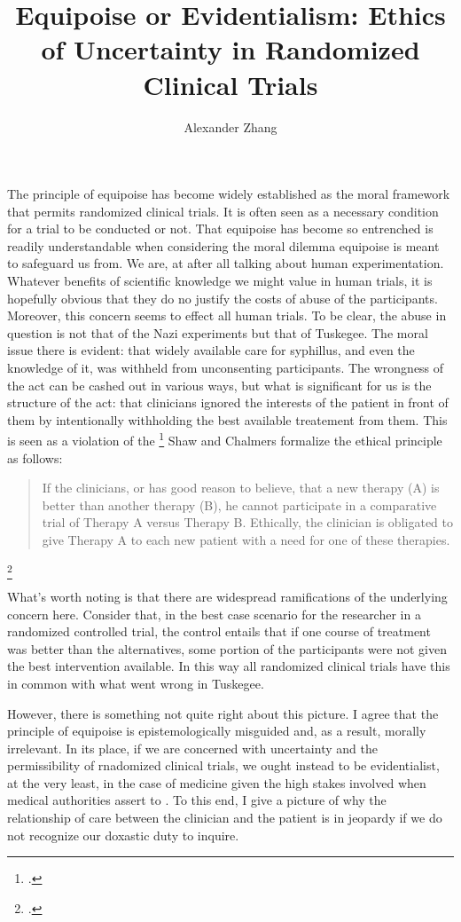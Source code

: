\documentclass[letterpaper,notitlepage,12pt]{article}
\title{Equipoise or Evidentialism: Ethics of Uncertainty in Randomized Clinical
Trials}
\author{Alexander Zhang}
\date{}
\begin{document}
\maketitle

The principle of equipoise has become widely established as the moral framework
that permits randomized clinical trials.
It is often seen as a necessary condition for a trial to be conducted or not.
That equipoise has become so entrenched is readily understandable when
considering the moral dilemma equipoise is meant to safeguard us from. We are,
at after all talking about human experimentation.
Whatever benefits of scientific knowledge we might value in human trials, it is
hopefully obvious that they do no justify the costs of abuse of the
participants.
Moreover, this concern seems to effect all human trials.
To be clear, the abuse in question is not that of the Nazi experiments but that
of Tuskegee.
The moral issue there is evident: that widely available care for syphillus, and
even the knowledge of it, was withheld from unconsenting participants.
The wrongness of the act can be cashed out in various ways, but what is
significant for us is the structure of the act: that clinicians ignored the
interests of the patient in front of them by intentionally withholding the best
available treatement from them.
This is seen as a violation of the \footcite[p. 487]{shaw_ethics_1970}
Shaw and Chalmers formalize the ethical principle as follows:
\blockquote{If the clinicians, or has good reason to believe, that a new
  therapy (A) is better than another therapy (B), he cannot participate in a
  comparative trial of Therapy A versus Therapy B. Ethically, the clinician is
  obligated to give Therapy A to each new patient with a need for one of these
therapies.}\footcite[p. 487]{shaw_ethics_1970}

What's worth noting is that there are widespread ramifications of the
underlying concern here.
Consider that, in the best case scenario for the researcher in a randomized
controlled trial, the control entails that if one course of treatment was better
than the alternatives, some portion of the participants were not given the best
intervention available.
In this way all randomized clinical trials have this in common with what went
wrong in Tuskegee.

However, there is something not quite right about this picture.
I agree that the principle of equipoise is epistemologically misguided and, as a
result, morally irrelevant.
In its place, if we are concerned with uncertainty and the permissibility of
rnadomized clinical trials, we ought instead to be evidentialist, at the very
least, in the case of medicine given the high stakes involved when medical
authorities assert to .
To this end, I give a picture of why the relationship of care between the
clinician and the patient is in jeopardy if we do not recognize our doxastic
duty to inquire.
\end{document}
